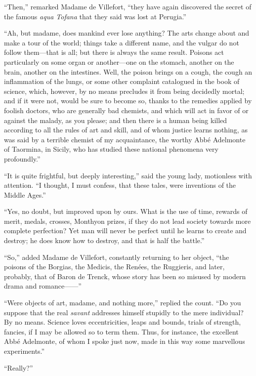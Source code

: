 “Then,” remarked Madame de Villefort, “they have again discovered the
secret of the famous \textit{aqua Tofana} that they said was lost at Perugia.”

“Ah, but madame, does mankind ever lose anything? The arts change about
and make a tour of the world; things take a different name, and the
vulgar do not follow them—that is all; but there is always the same
result. Poisons act particularly on some organ or another—one on the
stomach, another on the brain, another on the intestines. Well, the
poison brings on a cough, the cough an inflammation of the lungs, or
some other complaint catalogued in the book of science, which, however,
by no means precludes it from being decidedly mortal; and if it were
not, would be sure to become so, thanks to the remedies applied by
foolish doctors, who are generally bad chemists, and which will act in
favor of or against the malady, as you please; and then there is a
human being killed according to all the rules of art and skill, and of
whom justice learns nothing, as was said by a terrible chemist of my
acquaintance, the worthy Abbé Adelmonte of Taormina, in Sicily, who has
studied these national phenomena very profoundly.”

“It is quite frightful, but deeply interesting,” said the young lady,
motionless with attention. “I thought, I must confess, that these
tales, were inventions of the Middle Ages.”

“Yes, no doubt, but improved upon by ours. What is the use of time,
rewards of merit, medals, crosses, Monthyon prizes, if they do not lead
society towards more complete perfection? Yet man will never be perfect
until he learns to create and destroy; he does know how to destroy, and
that is half the battle.”

“So,” added Madame de Villefort, constantly returning to her object,
“the poisons of the Borgias, the Medicis, the Renées, the Ruggieris,
and later, probably, that of Baron de Trenck, whose story has been so
misused by modern drama and romance——”

“Were objects of art, madame, and nothing more,” replied the count. “Do
you suppose that the real \textit{savant} addresses himself stupidly to the
mere individual? By no means. Science loves eccentricities, leaps and
bounds, trials of strength, fancies, if I may be allowed so to term
them. Thus, for instance, the excellent Abbé Adelmonte, of whom I spoke
just now, made in this way some marvellous experiments.”

“Really?”

